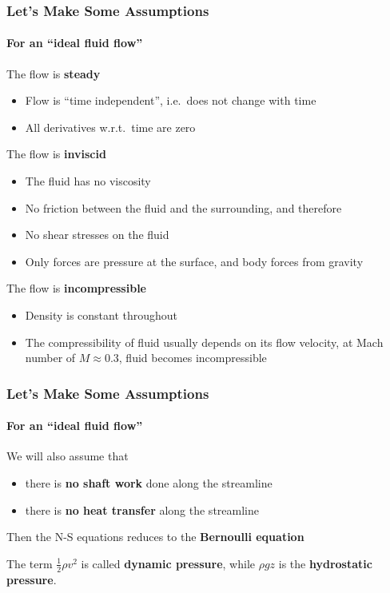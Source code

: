 \documentclass[12pt,aspectratio=169]{beamer}
\newcommand{\eq}[2]{\vspace{#1}{\Large\begin{displaymath}#2\end{displaymath}}}
\begin{document}
\begin{frame}
  \frametitle{Let's Make Some Assumptions}
  \framesubtitle{For an ``ideal fluid flow''}
  The flow is \textbf{steady}
  \begin{itemize}
  \item Flow is ``time independent'', i.e.\ does not change with time
  \item All derivatives w.r.t.\ time are zero
  \end{itemize}

  The flow is \textbf{inviscid}
  \begin{itemize}
  \item The fluid has no viscosity
  \item No friction between the fluid and the surrounding, and therefore
  \item No shear stresses on the fluid
  \item Only forces are pressure at the surface, and body forces from gravity
  \end{itemize}

  The flow is \textbf{incompressible}
  \begin{itemize}
  \item Density is constant throughout
  \item The compressibility of fluid usually depends on its flow velocity,
    at Mach number of $M\approx 0.3$, fluid becomes incompressible
  \end{itemize}
\end{frame}



\begin{frame}
  \frametitle{Let's Make Some Assumptions}
  \framesubtitle{For an ``ideal fluid flow''}
  We will also assume that
  \begin{itemize}
  \item there is \textbf{no shaft work} done along the streamline
  \item there is \textbf{no heat transfer} along the streamline
  \end{itemize}
  Then the N-S equations reduces to the
  \textbf{Bernoulli equation}
  
  \eq{-.1in}{\boxed{
      p_1+\frac{1}{2}\rho v_1^2 + \rho gz_1=
      p_2+\frac{1}{2}\rho v_2^2 + \rho gz_2
    }
  }
  
  The term $\displaystyle\frac{1}{2}\rho v^2$ is called
  \textbf{dynamic pressure}, while $\rho gz$ is the
  \textbf{hydrostatic pressure}.
\end{frame}
\end{document}
